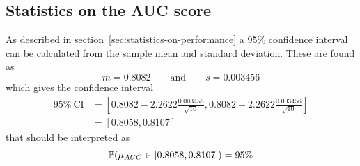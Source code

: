 \subsection{Statistics on the AUC score}\label{sec:recreating-winner-statistics}
As described in section~\ref{sec:statistics-on-performance} a 95\% confidence interval can be calculated from the sample mean and standard deviation. These are found as
\[
    m = 0.8082 \quad\quad\text{and}\quad\quad s = 0.003456
\]
which gives the confidence interval
\begin{align*}
    95\%\:\text{CI} &= [0.8082-2.2622\frac{0.003456}{\sqrt{10}}, 0.8082+2.2622\frac{0.003456}{\sqrt{10}}]\\
    &= [0.8058, 0.8107]
\end{align*}
that should be interpreted as 
\[
    \mathbb{P}(\mu_{AUC} \in [0.8058, 0.8107]) = 95\%
\]
